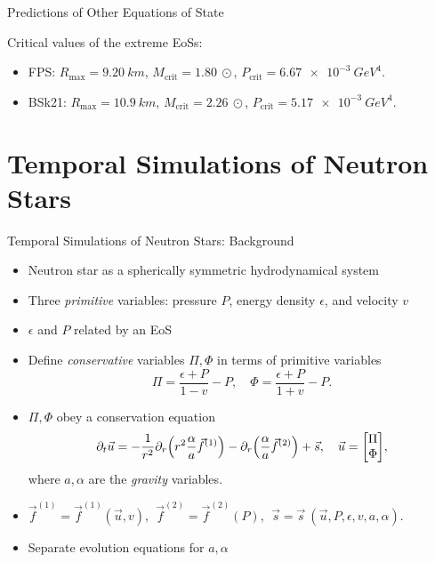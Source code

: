 \documentclass[handout]{beamer}
\newcommand{\p}{\partial}
\begin{document}
\begin{frame}{Predictions of Other Equations of State}
\begin{figure}[h!]
\begin{subfigure}{.5\textwidth}
            \end{subfigure}
        \end{figure} \pause
        Critical values of the extreme EoSs:
        \begin{itemize}
            \item FPS: $R_\text{max} = \SI{9.20}{km}$, $M_\text{crit} = \SI{1.80}{\odot}$, $P_\text{crit} = \SI{6.67e-3}{GeV^4}.$
            \item BSk21: $R_\text{max} = \SI{10.9}{km}$, $M_\text{crit} = \SI{2.26}{\odot}$, $P_\text{crit} = \SI{5.17e-3}{GeV^4}.$
        \end{itemize}

    \end{frame}

    \section{Temporal Simulations of Neutron Stars}

    \begin{frame}{Temporal Simulations of Neutron Stars: Background}
        \begin{itemize}
            \item Neutron star as a spherically symmetric hydrodynamical system
            \item Three \textit{primitive} variables: pressure $P$, energy density $\epsilon$, and velocity $v$
            \item $\epsilon$ and $P$ related by an EoS
            \item Define \textit{conservative} variables $\Pi, \Phi$ in terms of primitive variables
            \[\Pi = \frac{\epsilon + P}{1-v} - P, \quad \Phi = \frac{\epsilon + P}{1+v} - P.\]
            \item $\Pi, \Phi$ obey a conservation equation
            \[\p_t \vec{u} = -\frac{1}{r^2}\p_r\pqty{r^2\frac{\alpha}{a}\vec{f}^{(1)}} - \p_r\qty(\frac{\alpha}{a}\vec{f}^{(2)})+\vec{s}, \quad \vec{u} = \mqty[\Pi\\\Phi],\]
            where $a,\alpha$ are the \textit{gravity} variables.
            \item $\vec{f}^{(1)} = \vec{f}^{(1)} (\vec{u}, v),~~ \vec{f}^{(2)} = \vec{f}^{(2)}(P),~~ \vec{s} = \vec{s}~(\vec{u},P,\epsilon,v,a,\alpha)$.
            \item Separate evolution equations for $a,\alpha$
        \end{itemize}
    \end{frame}
\end{document}
